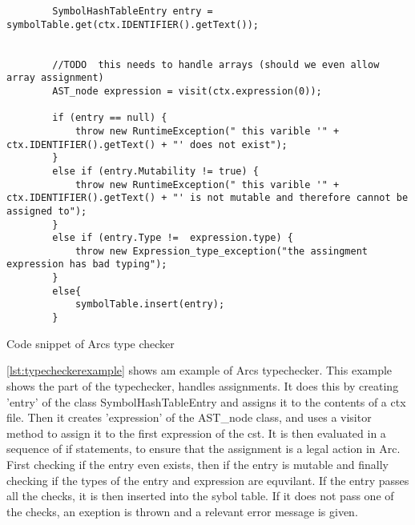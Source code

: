 \begin{listing}[htb!]
    \begin{verbatim}
        SymbolHashTableEntry entry = symbolTable.get(ctx.IDENTIFIER().getText());
        

        //TODO  this needs to handle arrays (should we even allow array assignment)
        AST_node expression = visit(ctx.expression(0));

        if (entry == null) {
            throw new RuntimeException(" this varible '" + ctx.IDENTIFIER().getText() + "' does not exist");
        }
        else if (entry.Mutability != true) {
            throw new RuntimeException(" this varible '" + ctx.IDENTIFIER().getText() + "' is not mutable and therefore cannot be assigned to");
        }
        else if (entry.Type !=  expression.type) {
            throw new Expression_type_exception("the assingment expression has bad typing");
        }
        else{
            symbolTable.insert(entry);
        }
    \end{verbatim}
    \caption{Code snippet of Arcs type checker}
    \label{lst:typecheckerexample}
\end{listing}

\ref{lst:typecheckerexample} shows am example of Arcs typechecker. This example shows the part of the typechecker, handles assignments. It does this by creating 'entry' of the class SymbolHashTableEntry and assigns it to the contents of a ctx file. Then it creates 'expression' of the AST\_node class, and uses a visitor method to assign it to the first expression of the \gls{cst}. It is then evaluated in a sequence of if statements, to ensure that the assignment is a legal action in Arc. First checking if the entry even exists, then if the entry is mutable and finally checking if the types of the entry and expression are equvilant. If the entry passes all the checks, it is then inserted into the sybol table. If it does not pass one of the checks, an exeption is thrown and a relevant error message is given.


